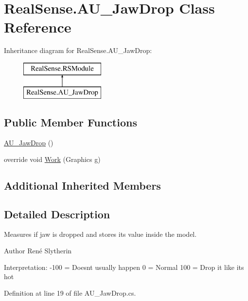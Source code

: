 \hypertarget{class_real_sense_1_1_a_u___jaw_drop}{}\section{Real\+Sense.\+A\+U\+\_\+\+Jaw\+Drop Class Reference}
\label{class_real_sense_1_1_a_u___jaw_drop}
Inheritance diagram for Real\+Sense.\+A\+U\+\_\+\+Jaw\+Drop\+:\begin{figure}[H]
\begin{center}
\leavevmode
\includegraphics[height=2.000000cm]{class_real_sense_1_1_a_u___jaw_drop}
\end{center}
\end{figure}
\subsection*{Public Member Functions}
\begin{DoxyCompactItemize}
\item 
\hyperlink{class_real_sense_1_1_a_u___jaw_drop_a28f51c63dfbf79d8315c689b6ae2b65b}{A\+U\+\_\+\+Jaw\+Drop} ()
\item 
override void \hyperlink{class_real_sense_1_1_a_u___jaw_drop_aed90ca88a1c563016c6af39fd65f81e4}{Work} (Graphics g)
\end{DoxyCompactItemize}
\subsection*{Additional Inherited Members}


\subsection{Detailed Description}
Measures if jaw is dropped and stores its\textquotesingle{} value inside the model. \begin{DoxyAuthor}{Author}
René  Slytherin
\end{DoxyAuthor}
Interpretation\+: -\/100 = Doesn\textquotesingle{}t usually happen 0 = Normal 100 = Drop it like it\textquotesingle{}s hot 

Definition at line 19 of file A\+U\+\_\+\+Jaw\+Drop.\+cs.



